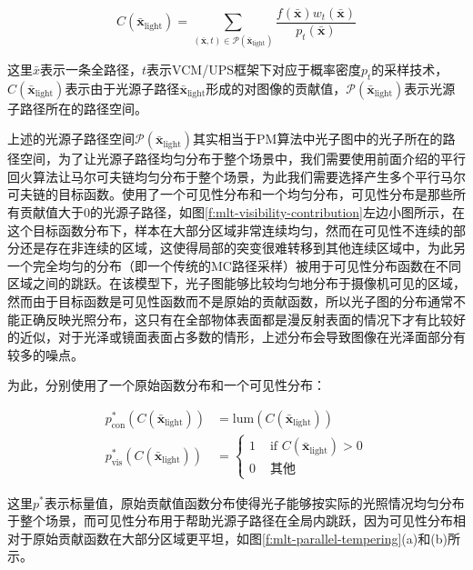\begin{equation}
	C(\bar{\mathbf{x}}_{\text{light}})=\sum_{(\bar{\mathbf{x}},t)\in\mathcal{P}(\bar{\mathbf{x}}_{\text{light}})}\frac{f(\bar{\mathbf{x}})w_t(\bar{\mathbf{x}})}{p_t(\bar{\mathbf{x}})}
\end{equation}

\noindent 这里$\bar{x}$表示一条全路径，$t$表示VCM/UPS框架下对应于概率密度$p_t$的采样技术，$C(\bar{\mathbf{x}}_{\text{light}})$表示由于光源子路径$\bar{\mathbf{x}}_{\text{light}}$形成的对图像的贡献值，$\mathcal{P}(\bar{\mathbf{x}}_{\text{light}})$表示光源子路径所在的路径空间。

上述的光源子路径空间$\mathcal{P}(\bar{\mathbf{x}}_{\text{light}})$其实相当于PM算法中光子图中的光子所在的路径空间，为了让光源子路径均匀分布于整个场景中，我们需要使用前面介绍的平行回火算法让马尔可夫链均匀分布于整个场景，为此我们需要选择产生多个平行马尔可夫链的目标函数。\cite{a:RobustAdaptivePhotonTracingusingPhotonPathVisibility}使用了一个可见性分布和一个均匀分布，可见性分布是那些所有贡献值大于0的光源子路径，如图\ref{f:mlt-visibility-contribution}左边小图所示，在这个目标函数分布下，样本在大部分区域非常连续均匀，然而在可见性不连续的部分还是存在非连续的区域，这使得局部的突变很难转移到其他连续区域中，为此另一个完全均匀的分布（即一个传统的MC路径采样）被用于可见性分布函数在不同区域之间的跳跃。在该模型下，光子图能够比较均匀地分布于摄像机可见的区域，然而由于目标函数是可见性函数而不是原始的贡献函数，所以光子图的分布通常不能正确反映光照分布，这只有在全部物体表面都是漫反射表面的情况下才有比较好的近似，对于光泽或镜面表面占多数的情形，上述分布会导致图像在光泽面部分有较多的噪点。

为此，\cite{a:RobustLightTransportSimulationviaMetropolisedBidirectionalEstimators}分别使用了一个原始函数分布和一个可见性分布：

\begin{equation}
\begin{aligned}
	p^{*}_\text{con}(C(\bar{\mathbf{x}}_{\text{light}}))&=\text{lum}(C(\bar{\mathbf{x}}_{\text{light}}))\\
	p^{*}_\text{vis}(C(\bar{\mathbf{x}}_{\text{light}}))&=\begin{cases}
		1 & \text{ if }C(\bar{\mathbf{x}}_{\text{light}})>0\\
		0 & \text{ 其他}
	\end{cases}
\end{aligned}
\end{equation}

\noindent 这里$p^{*}$表示标量值，原始贡献值函数分布使得光子能够按实际的光照情况均匀分布于整个场景，而可见性分布用于帮助光源子路径在全局内跳跃，因为可见性分布相对于原始贡献函数在大部分区域更平坦，如图\ref{f:mlt-parallel-tempering}(a)和(b)所示。

